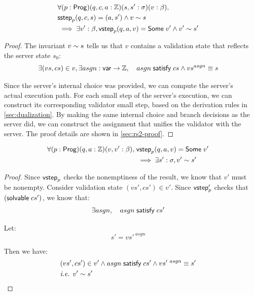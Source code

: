 \begin{lemma}[\ref{eq:rs2}]
  \begin{align*}
    &\forall(p:\mathsf{Prog})(q,c,a:\mathbb Z)(s,s':\sigma)(v:\beta),\\
    &\mathsf{sstep}_p(q,c,s)=(a,s')\wedge v\sim s\\
    &\implies\exists v':\beta,\mathsf{vstep}_p(q,a,v)=\mathsf{Some}\;v'\wedge v'\sim s'
  \end{align*}
\begin{proof}
The invariant $v\sim s$ tells us that $v$ contains a validation state
that reflects the server state $s_0$:
\[\exists(vs,cs)\in v,\exists asgn:\mathsf{var}\to\mathbb Z,\quad asgn\;\mathsf{satisfy}\;cs\wedge {vs}^{asgn}\equiv s\]

Since the server's internal choice was provided, we can compute the server's
actual execution path.  For each small step of the server's execution, we can
construct its corresponding validator small step, based on the derivation rules
in \autoref{sec:dualization}.  By making the same internal choice and branch
decisions as the server did, we can construct the assignment that unifies the
validator with the server.  The proof details are shown in \autoref{sec:rs2-proof}.
\end{proof}
\end{lemma}

\begin{lemma}[\ref{eq:rc1}]
\begin{align*}
\forall(p:\mathsf{Prog})(q,a:\mathbb Z)(v,v':\beta),\;&\mathsf{vstep}_p(q,a,v)=\mathsf{Some}\;v'\\
&\implies\exists s':\sigma,v'\sim s'
\end{align*}
\begin{proof}
Since $\mathsf{vstep}_p$ checks the nonemptiness of the result, we know that $v'$ must
be nonempty.  Consider validation state $(vs',cs')\in v'$.  Since $\mathsf{vstep}'_p$
checks that $(\mathsf{solvable}\; cs')$, we know that:
\[\exists asgn,\quad asgn\;\mathsf{satisfy}\;cs'\]

Let:
\[s'=vs'^{~asgn}\]

Then we have:
\begin{align*}
&(vs',cs')\in v'\wedge asgn\;\mathsf{satisfy}\;cs'\wedge vs'^{~asgn}\equiv s'\\
&\textit{i.e. }v'\sim s'
\end{align*}
\end{proof}
\end{lemma}


